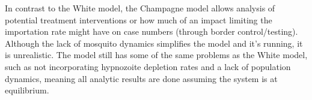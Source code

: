 In contrast to the White model, the Champagne model allows analysis of
potential treatment interventions or how much of an impact limiting the
importation rate might have on case numbers (through border control/testing).
Although the lack of mosquito dynamics simplifies the model and it's running,
it is unrealistic. The model still has some of the same problems as the White
model, such as not incorporating hypnozoite depletion rates and a lack of
population dynamics, meaning all analytic results are done assuming the system
is at equilibrium.